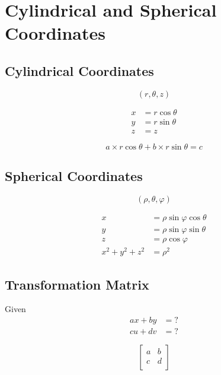 \section{Cylindrical and Spherical Coordinates}

  \subsection{Cylindrical Coordinates}

    \begin{equation}
      \left( r, \theta, z \right)
    \end{equation}

    \begin{align}
      x &= r \cos\theta \\
      y &= r \sin\theta \\
      z &= z
    \end{align}

    \begin{equation}
      a \times r \cos\theta + b \times r \sin\theta = c
    \end{equation}

  \subsection{Spherical Coordinates}

    \begin{equation}
      \left( \rho, \theta, \varphi \right)
    \end{equation}

    \begin{align}
      x &= \rho \sin\varphi \cos\theta \\
      y &= \rho \sin\varphi \sin\theta \\
      z &= \rho \cos\varphi \\
      x^{2} + y^{2} + z^{2} &= \rho^{2}
    \end{align}

  \subsection{Transformation Matrix}

    Given
    \begin{align*}
      a x + b y &= ? \\
      c u + d v &= ?
    \end{align*}

    \begin{equation}
      \begin{bmatrix}
        a & b \\
        c & d \\
      \end{bmatrix}
    \end{equation}

